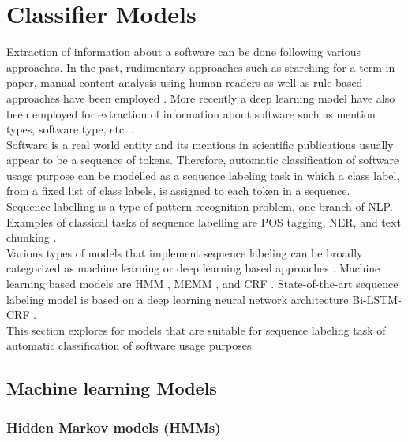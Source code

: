 \chapter{Classifier Models}
\label{ch:chapter04}
 
%
%

Extraction of information about a software can be done following various approaches. In the past, rudimentary approaches such as searching for a term in paper, manual content analysis using human readers as well as rule based approaches have been employed \citep{kruger2019literature}.  More recently a deep learning model have also been employed for extraction of  information about software such as mention types, software type, etc. \citep{schindler2022role}. \\

Software is a real world entity and its mentions in scientific publications usually appear to be a sequence of tokens.  Therefore, automatic classification of software usage purpose can be modelled as a sequence labeling task in which a class label, from a fixed list of class labels, is assigned to each token in a sequence. \\


Sequence labelling is a type of pattern recognition problem, one branch of \ac{NLP}. Examples of classical tasks of sequence labelling are \ac{POS} tagging, \ac{NER}, and text chunking \citep{akhundov2018sequence, he2020survey}.  \\

Various types of models that implement sequence labeling can be broadly categorized as machine learning or deep learning based approaches \citep{he2020survey}. Machine learning based models are \ac{HMM} \citep{kupiec1992robust}, \ac{MEMM} \citep{mccallum2000maximum}, and \ac{CRF} \citep{lafferty2001conditional}.  State-of-the-art sequence labeling model is based on a deep learning neural network architecture \ac{Bi-LSTM-CRF} \citep{huang2015bidirectional}. \\

This section explores for models that are suitable for sequence labeling task of automatic classification of software usage purposes. 

\section{Machine learning Models}
\label{sec:chapter05:MLModels}

\subsection{Hidden Markov models (\ac{HMM}s)}
\label{sec:chapter05:MLModels:HMMS}

